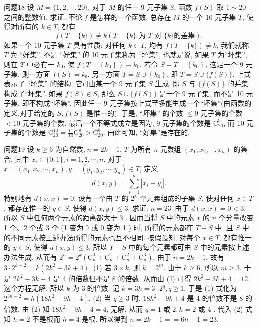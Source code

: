 问题18 设 $M=\{1,2, \cdots, 20\}$, 对于 $M$ 的任一 9 元子集 $S$, 函数 $f(S)$ 取 $1 \sim 20$ 之间的整数值.
求证: 不论 $f$ 是怎样的一个函数, 总存在 $M$ 的一个 10 元子集 $T$, 使得对所有的 $k \in T$, 都有
$$
f(T-\{k\}) \neq k(T-\{k\} \text { 为 } T \text { 对 }\{k\} \text{的差集}).
$$
如果一个 10 元子集 $T$ 具有性质: 对任何 $k \in T$, 均有 $f(T-\{k\}) \neq k$, 我们就称 $T$ 为 “好集”. 不是 “好集” 的 10 元子集称为 “坏集”, 也就是说, 如果 $T$ 为“坏集”, 则在 $T$ 中必有一 $k_0$, 使 $f\left(T-\left\{k_0\right\}\right)=k_0$. 若令 $S=T-\left\{k_0\right\}$, 这是一个 9 元子集, 则一方面 $f(S)=k_0$, 另一方面 $T=S \cup\left\{k_0\right\}$, 即 $T=S \cup \{f(S)\}$. 上式表示了 “坏集” 的结构, 它可由某一个 9 元子集 $S$ 生成, 即 $S$ 与 $\{f(S)\}$ 的并集构成了“坏集”.
如果 $f(S) \in S$, 那么 $S \cup\{f(S)\}$ 是一个 9 元子集, 而不是 10 元子集, 即不构成“坏集”. 因此任一 9 元子集按上式至多能生成一个“坏集”(由函数的定义,对于给定的 $S, f(S)$ 是惟一的). 于是, “坏集” 的个数 $\leqslant 9$ 元子集的个数 $<10$ 元子集的个数.
最后一个不等式成立是因为, 9 元子集的个数是 $\mathrm{C}_{20}^9$, 而 10 元子集的个数是 $\mathrm{C}_{20}^{10}=\frac{11}{10} \mathrm{C}_{20}^9>\mathrm{C}_{20}^9$. 由此可知, “好集”是存在的.



问题19 设 $k \geqslant 6$ 为自然数, $n=2 k-1$. $T$ 为所有 $n$ 元数组 $\left(x_1, x_2, \cdots, x_n\right)$ 的集合, 其中 $x_i \in\{0,1\}, i=1,2, \cdots, n$. 对于 $x=\left(x_1, x_2, \cdots, x_n\right), y= \left(y_1, y_2, \cdots, y_n\right) \in T$, 定义
$$
d(x, y)=\sum_{i=1}^n\left|x_i-y_i\right| .
$$
特别地有 $d(x, x)=0$. 设有一个由 $T$ 的 $2^k$ 个元素组成的子集 $S$, 使对任何 $x \in T$, 都存在惟一的 $y \in S$, 使得 $d(x, y) \leqslant 3$. 求证: $n=23$.
由于 $d(x, x)=0<3$, 所以 $S$ 中任何两个元素的距离都大于 3 . 因而当将 $S$ 中的元素 $x$ 的 $n$ 个分量改变 1 个、2 个或 3 个 (1 变为 0 或 0 变为 1 ) 时, 所得的元素都在 $T-S$ 中, 且 $S$ 中的不同元素按上述办法所得的元素也互不相同.
按假设知, 对每个 $x \in T$, 都有惟一的 $y \in S$, 使得 $d(x, y) \leqslant 3$, 所以 $T- S$ 中的每个元素都可由 $S$ 中的元素按上述办法生成.
从而有 $2^n=2^k\left(\mathrm{C}_n^0+\mathrm{C}_n^1+\right. \left.\mathrm{C}_n^2+\mathrm{C}_n^3\right)$. 由于 $n=2 k-1$, 故有 $3 \cdot 2^{k-2}=k\left(2 k^2-3 k+4\right)$. (1) 若 $3 \times k$, 则 $k= 2^m$. 由于 $k \geqslant 6$, 所以 $m \geqslant 3$. 于是 $2 k^2-3 k+4$ 是 4 的倍数但不是 8 的倍数.
从而由 (1) 可得 $2 k^2-3 k+4=12$, 这个方程无解, 所以 $k$ 为 3 的倍数.
记 $k= 3 h=3 \cdot 2^q, q \geqslant 1$, 于是 (1) 式化为 $2^{3 h-2}=h\left(18 h^2-9 h+4\right)$. (2) 当 $q \geqslant 3$ 时, $18 h^2-9 h+4$ 是 4 的倍数不是 8 的倍数.
由 (2) 知 $18 h^2-9 h+4=4$, 无解.
从而 $q=1$ 或 $2, h=2$ 或 4 . 代入 (2) 式知 $h=2$ 不是根而 $h=4$ 是根.
所以得到 $n=2 k-1==6 h-1=23$.




